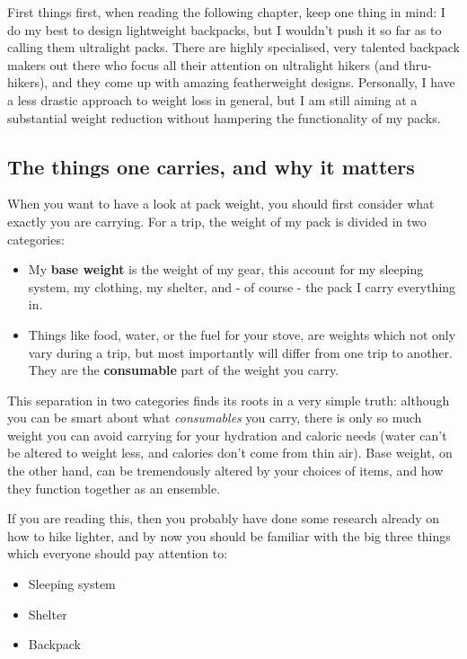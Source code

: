 First things first, when reading the following chapter, keep one thing in mind: I do my best to design lightweight backpacks, but I wouldn't push it so far as to calling them ultralight packs. There are highly specialised, very talented backpack makers out there who focus all their attention on ultralight hikers (and thru-hikers),  and they come up with amazing featherweight designs. Personally, I have a less drastic approach to weight loss in general, but I am still aiming at a substantial weight reduction without hampering the functionality of my packs.

\subsection{The things one carries, and why it matters}

When you want to have a look at pack weight, you should first consider what exactly you are carrying. For a trip, the weight of my pack is divided in two categories:

\begin{itemize}

	\item My \textbf{base weight} is the weight of my gear, this account for my sleeping system, my clothing, my shelter, and - of course - the pack I carry everything in.

	\item Things like food, water, or the fuel for your stove, are weights which not only vary during a trip, but most importantly will differ from one trip to another. They are the \textbf{consumable} part of the weight you carry.

\end{itemize}

This separation in two categories finds its roots in a very simple truth: although you can be smart about what \textit{consumables} you carry, there is only so much weight you can avoid carrying for your hydration and caloric needs (water can't be altered to weight less, and calories don't come from thin air). Base weight, on the other hand, can be tremendously altered by your choices of items, and how they function together as an ensemble.

If you are reading this, then you probably have done some research already on how to hike lighter, and by now you should be familiar with the big three things which everyone should pay attention to:

\begin{itemize}

	\item Sleeping system
	\item Shelter
	\item Backpack

\end{itemize}

